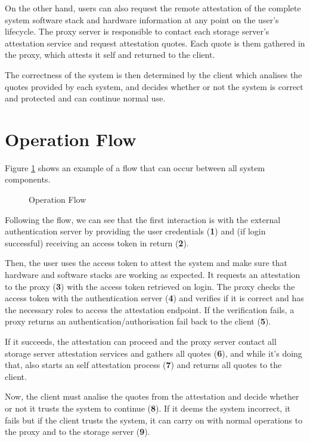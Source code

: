 On the other hand, users can also request the remote attestation of the complete system software stack and hardware information at any point on the user's lifecycle. The proxy server is responsible to contact each storage server's attestation service and request attestation quotes. Each quote is them gathered in the proxy, which attests it self and returned to the client.

The correctness of the system is then determined by the client which analises the quotes provided by each system, and decides whether or not the system is correct and protected and can continue normal use.

\section{Operation Flow}
\label{sec:operation_flow}

Figure \ref{fig:operation_flow} shows an example of a flow that can occur between all system components.

\begin{figure}[htbp]
  \caption{Operation Flow}
  \label{fig:operation_flow}
\end{figure}

Following the flow, we can see that the first interaction is with the external authentication server by providing the user credentials (\textbf{1}) and (if login successful) receiving an access token in return (\textbf{2}). 

Then, the user uses the access token to attest the system and make sure that hardware and software stacks are working as expected. It requests an attestation to the proxy (\textbf{3}) with the access token retrieved on login. The proxy checks the access token with the authentication server (\textbf{4}) and verifies if it is correct and has the necessary roles to access the attestation endpoint. If the verification fails, a proxy returns an authentication/authorisation fail back to the client (\textbf{5}). 

If it succeeds, the attestation can proceed and the proxy server contact all storage server attestation services and gathers all quotes (\textbf{6}), and while it's doing that, also starts an self attestation process (\textbf{7}) and returns all quotes to the client. 

Now, the client must analise the quotes from the attestation and decide whether or not it trusts the system to continue (\textbf{8}). If it deems the system incorrect, it fails but if the client trusts the system, it can carry on with normal operations to the proxy and to the storage server (\textbf{9}).

